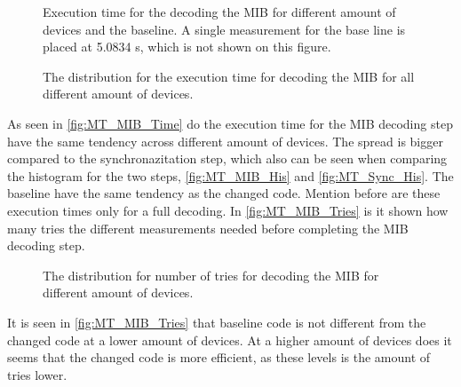 \begin{minipage}{0.48\textwidth}
\begin{figure}[H]
\centering
\resizebox{0.9\textwidth}{!}{
}
\caption{Execution time for the decoding the MIB for different amount of devices and the baseline. A single measurement for the base line is placed at 5.0834 s, which is not shown on this figure.}
\label{fig:MT_MIB_Time}
\end{figure}
\end{minipage}%
\hfill
\begin{minipage}{0.48\textwidth}
\begin{figure}[H]
\centering
\resizebox{0.9\textwidth}{!}{
}
\caption{The distribution for the execution time for decoding the MIB for all different amount of devices.}
\label{fig:MT_MIB_His}
\end{figure}
\end{minipage}

As seen in \autoref{fig:MT_MIB_Time} do the execution time for the MIB decoding step have the same tendency across different amount of devices. The spread is bigger compared to the synchronazitation step, which also can be seen when comparing the histogram for the two steps, \autoref{fig:MT_MIB_His} and \autoref{fig:MT_Sync_His}. The baseline have the same tendency as the changed code. Mention before are these execution times only for a full decoding. In \autoref{fig:MT_MIB_Tries} is it shown how many tries the different measurements needed before completing the MIB decoding step.

\begin{figure}[H]
\centering
\resizebox{0.5\textwidth}{!}{
}
\caption{The distribution for number of tries for decoding the MIB for different amount of devices.}
\label{fig:MT_MIB_Tries}
\end{figure}

It is seen in \autoref{fig:MT_MIB_Tries} that baseline code is not different from the changed code at a lower amount of devices. At a higher amount of devices does it seems that the changed code is more efficient, as these levels is the amount of tries lower.



